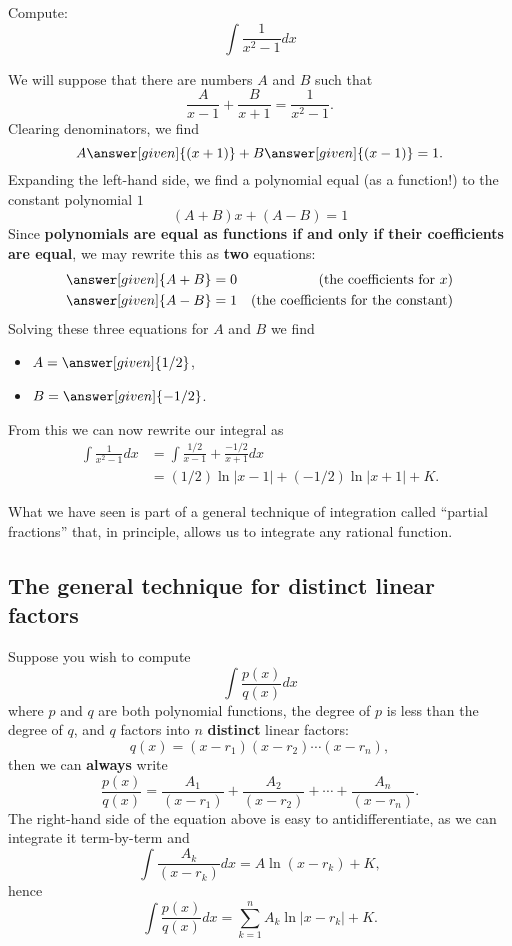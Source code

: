 \documentclass{ximera}
\begin{document}
\begin{example}
  Compute:
  \[
  \int \frac{1}{x^2-1} dx
  \]
  \begin{explanation}
    We will suppose that there are numbers $A$ and $B$ such that
    \[
    \frac{A}{x-1} + \frac{B}{x+1} = \frac{1}{x^2-1}.
    \]
    Clearing denominators, we find
    \[
    A\answer[given]{(x+1)} + B\answer[given]{(x-1)} = 1.
    \]
    Expanding the left-hand side, we find a polynomial equal (as a
    function!) to the constant polynomial $1$
    \[
    (A+ B)x + (A-B) = 1
    \]
    Since \textbf{polynomials are equal as functions if and only if
      their coefficients are equal}, we may rewrite this as
    \textbf{two} equations:
    \begin{align*}
      \answer[given]{A+B} &= 0 &\text{(the coefficients for $x$)}\\
      \answer[given]{A-B} &= 1 &\text{(the coefficients for the constant)}
    \end{align*}
    Solving these three equations for $A$ and $B$ we find
    \begin{itemize}
    \item $A = \answer[given]{1/2}$,
    \item $B = \answer[given]{-1/2}$.
    \end{itemize} 
    From this we can now rewrite our integral as
    \begin{align*}
      \int \frac{1}{x^2-1} dx &=  \int \frac{1/2}{x-1} + \frac{-1/2}{x+1} dx\\
      &= (1/2)\ln|x-1| + (-1/2)\ln|x+1|+ K.
    \end{align*}
  \end{explanation}
\end{example}

What we have seen is part of a general technique of integration called
``partial fractions'' that, in principle,
allows us to integrate any rational function.

\subsection{The general technique for distinct linear factors}

Suppose you wish to compute
\[
\int \frac{p(x)}{q(x)} dx
\]
where $p$ and $q$ are both polynomial functions, the degree of $p$ is
less than the degree of $q$, and $q$ factors into $n$
\textbf{distinct} linear factors:
\[
q(x) = (x-r_1) (x-r_2) \cdots (x-r_n),
\]
then we can \textbf{always} write
\[
\frac{p(x)}{q(x)}  = \frac{A_1}{(x-r_1)} + \frac{A_2}{(x-r_2)} + \cdots + \frac{A_n}{(x-r_n)}. 
\]
The right-hand side of the equation above is easy to antidifferentiate,
as we can integrate it term-by-term and
\[
\int \frac{A_k}{(x-r_k)} dx = A \ln(x-r_k) + K,
\]
hence
\[
\int \frac{p(x)}{q(x)} dx = \sum_{k=1}^n A_k \ln|x-r_k| +K.
\]
\end{document}
